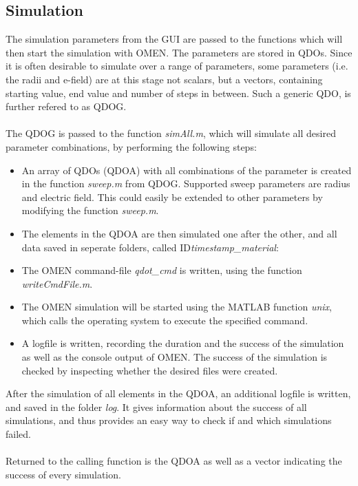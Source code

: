 \subsection{Simulation}
	The simulation parameters from the GUI are passed to the functions which will then start the simulation with OMEN.
	The parameters are stored in QDOs. Since it is often desirable to simulate over a range of parameters, some parameters 
	(i.e. the radii and e-field) are at this stage not scalars, but a vectors, containing starting value, end value and number of steps in between. 
	Such a generic QDO,  is further refered to as QDOG.
	\\\\
	The QDOG is passed to the function \textit{simAll.m}, which will simulate all desired parameter combinations, by performing the following steps:
	\begin{itemize}
		\item An array of QDOs (QDOA) with all combinations of the parameter is created in the function \textit{sweep.m} from QDOG. 
		Supported sweep parameters are radius and electric field. This could easily be extended to other parameters by modifying the function \textit{sweep.m}.
		\item The elements in the QDOA are then simulated one after the other, and all data saved in seperate folders, called ID\textit{timestamp\_material}: 
		\item The OMEN command-file \textit{qdot\_cmd} is written, using the function \textit{writeCmdFile.m}.
		\item The OMEN simulation will be started using the MATLAB function \textit{unix}, which calls the operating system to execute the specified command.
		\item A logfile is written, recording the duration and the success of the simulation as well as the console output of OMEN. The success of the simulation
		is checked by inspecting whether the desired files were created.
	\end{itemize}
	After the simulation of all elements in the QDOA, an additional logfile is written, and saved in the folder \textit{log}. It gives information about the 
	success of all simulations, and thus provides an easy way to check if and which simulations failed.
	\\\\
	Returned to the calling function is the QDOA as well as a vector indicating the success of every simulation.
	\\\\
